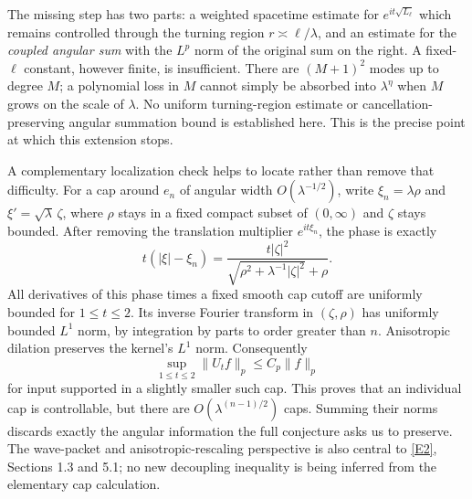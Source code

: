 \documentclass[11pt]{article}
\newcommand{\eref}[2]{\hyperlink{extra:#1:#2}{[E#2]}}
\begin{document}
	The missing step has two parts: a weighted spacetime estimate for
	$e^{it\sqrt{L_\ell}}$ which remains controlled through the turning region
	$r\asymp\ell/\lambda$, and an estimate for the \emph{coupled angular sum}
	with the $L^p$ norm of the original sum on the right. A fixed-$\ell$
	constant, however finite, is insufficient. There are $(M+1)^2$ modes up
	to degree $M$; a polynomial loss in $M$ cannot simply be absorbed into
	$\lambda^\eta$ when $M$ grows on the scale of $\lambda$. No uniform
	turning-region estimate or cancellation-preserving angular summation
	bound is established here. This is the precise point at which this
	extension stops.
	
	A complementary localization check helps to locate rather than remove
	that difficulty. For a cap around $e_n$ of angular width
	$O(\lambda^{-1/2})$, write $\xi_n=\lambda\rho$ and
	$\xi'=\sqrt\lambda\,\zeta$, where $\rho$ stays in a fixed compact
	subset of $(0,\infty)$ and $\zeta$ stays bounded. After removing the
	translation multiplier $e^{it\xi_n}$, the phase is exactly
	\begin{equation}\label{statement:capphase}
		t(|\xi|-\xi_n)=
		\frac{t|\zeta|^2}{\sqrt{\rho^2+\lambda^{-1}|\zeta|^2}+\rho}.
	\end{equation}
	All derivatives of this phase times a fixed smooth cap cutoff are
	uniformly bounded for $1\leq t\leq2$. Its inverse Fourier transform in
	$(\zeta,\rho)$ has uniformly bounded $L^1$ norm, by integration by
	parts to order greater than $n$. Anisotropic dilation preserves the
	kernel's $L^1$ norm. Consequently
	\[
	\sup_{1\leq t\leq2}\|U_tf\|_p\leq C_p\|f\|_p
	\]
	for input supported in a slightly smaller such cap. This proves that
	an individual cap is controllable, but there are
	$O(\lambda^{(n-1)/2})$ caps. Summing their norms discards exactly the
	angular information the full conjecture asks us to preserve. The
	wave-packet and anisotropic-rescaling perspective is also central to
	\eref{statement}{2}, Sections 1.3 and 5.1; no new decoupling inequality is
	being inferred from the elementary cap calculation.
	
\end{document}

